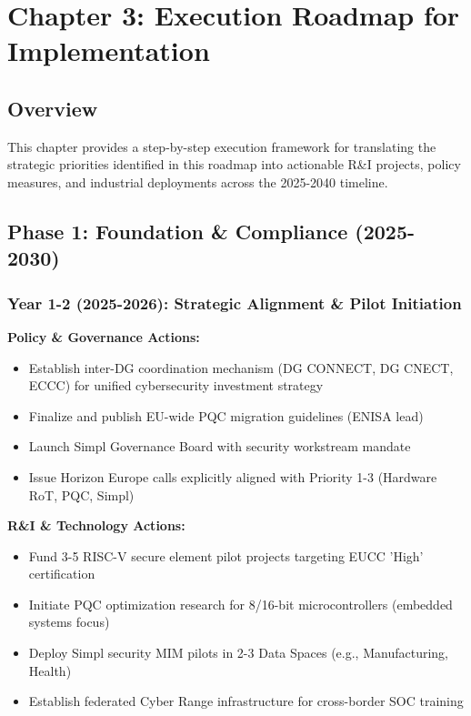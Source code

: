 \documentclass[12pt,a4paper]{article}
\begin{document}
\newpage
\section{Chapter 3: Execution Roadmap for Implementation}

\subsection*{Overview}
This chapter provides a step-by-step execution framework for translating the strategic priorities identified in this roadmap into actionable R\&I projects, policy measures, and industrial deployments across the 2025-2040 timeline.

\subsection*{Phase 1: Foundation \& Compliance (2025-2030)}

\subsubsection*{Year 1-2 (2025-2026): Strategic Alignment \& Pilot Initiation}
\textbf{Policy \& Governance Actions:}
\begin{itemize}
    \item Establish inter-DG coordination mechanism (DG CONNECT, DG CNECT, ECCC) for unified cybersecurity investment strategy
    \item Finalize and publish EU-wide PQC migration guidelines (ENISA lead)
    \item Launch Simpl Governance Board with security workstream mandate
    \item Issue Horizon Europe calls explicitly aligned with Priority 1-3 (Hardware RoT, PQC, Simpl)
\end{itemize}

\textbf{R\&I \& Technology Actions:}
\begin{itemize}
    \item Fund 3-5 RISC-V secure element pilot projects targeting EUCC 'High' certification
    \item Initiate PQC optimization research for 8/16-bit microcontrollers (embedded systems focus)
    \item Deploy Simpl security MIM pilots in 2-3 Data Spaces (e.g., Manufacturing, Health)
    \item Establish federated Cyber Range infrastructure for cross-border SOC training
\end{itemize}
\end{document}
